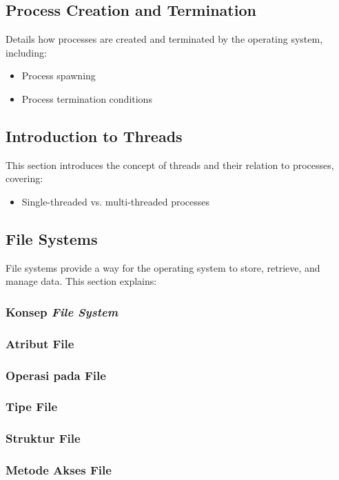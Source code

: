\documentclass[12pt]{article}
\begin{document}
\subsection{Process Creation and Termination}
Details how processes are created and terminated by the operating system, including:
\begin{itemize}
    \item Process spawning
    \item Process termination conditions
\end{itemize}

\subsection{Introduction to Threads}
This section introduces the concept of threads and their relation to processes, covering:
\begin{itemize}
    \item Single-threaded vs. multi-threaded processes
\end{itemize}
\subsection{File Systems}
File systems provide a way for the operating system to store, retrieve, and manage data. This section explains:
\subsubsection{Konsep \textit{File System}}
\subsubsection{Atribut File}
\subsubsection{Operasi pada File}
\subsubsection{Tipe File}
\subsubsection{Struktur File}
\subsubsection{Metode Akses File}
\end{document}
